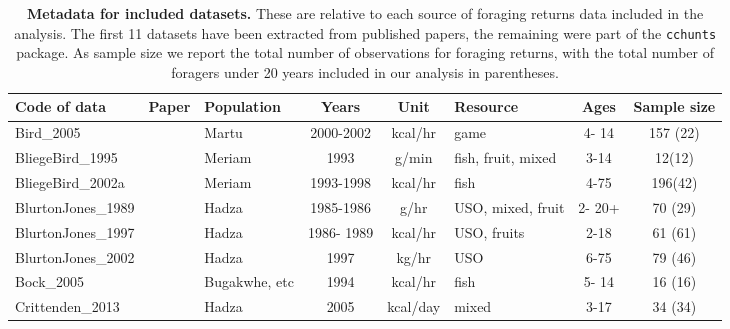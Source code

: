 \begin{landscape}
\begin{longtable}{M{2.6cm} M{3.6cm} M{1.5cm} c c M{1cm} c c}
\caption{\textbf{Metadata for included datasets.} These are relative to each source of foraging returns data included in the analysis. The first 11 datasets have been extracted from published papers, the remaining were part of the \texttt{cchunts} package. As sample size we report the total number of observations for foraging returns, with the total number of foragers under 20 years included in our analysis in parentheses. }\\
\hline
{} 
Code of data                  & Paper                                     & Population      & Years      & Unit      & Resource           & Ages    & Sample size \\ \hline
\endfirsthead
%
\endhead
%
Bird\_2005                     & \cite{bird_mardu_2005}                    & Martu           & 2000-2002  & kcal/hr   & game               & 4- 14   & 157 (22)    \\%
BliegeBird\_1995               & \cite{bird_children_1995}                 & Meriam          & 1993       & g/min     & fish, fruit, mixed & 3-14    & 12(12)      \\
BliegeBird\_2002a              & \cite{bird_constraints_2002}              & Meriam          & 1993-1998  & kcal/hr   & fish               & 4-75    & 196(42)     \\
BlurtonJones\_1989             & \cite{blurton_jones_modelling_1989}       & Hadza           & 1985-1986  & g/hr      & USO, mixed, fruit  & 2- 20+  & 70 (29)     \\
BlurtonJones\_1997             & \cite{blurton_jones_why_1997}             & Hadza           & 1986- 1989 & kcal/hr   & USO, fruits        & 2-18    & 61 (61)     \\
BlurtonJones\_2002             & \cite{blurton_jones_selection_2002}       & Hadza           & 1997       & kg/hr     & USO                & 6-75    & 79 (46)     \\
Bock\_2005                     & \cite{bock_what_2005}                     & Bugakwhe, etc & 1994       & kcal/hr   & fish               & 5- 14   & 16 (16)     \\
Crittenden\_2013               & \cite{crittenden_juvenile_2013}           & Hadza           & 2005       & kcal/day & mixed              & 3-17    & 34 (34)     \\

\end{longtable}
\end{landscape}
